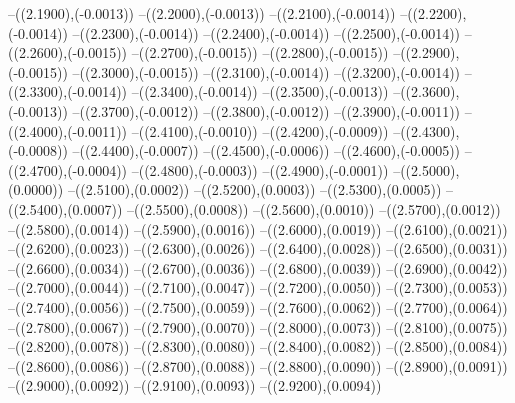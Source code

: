 {	--({\sx*(2.1900)},{\sy*(-0.0013)})
	--({\sx*(2.2000)},{\sy*(-0.0013)})
	--({\sx*(2.2100)},{\sy*(-0.0014)})
	--({\sx*(2.2200)},{\sy*(-0.0014)})
	--({\sx*(2.2300)},{\sy*(-0.0014)})
	--({\sx*(2.2400)},{\sy*(-0.0014)})
	--({\sx*(2.2500)},{\sy*(-0.0014)})
	--({\sx*(2.2600)},{\sy*(-0.0015)})
	--({\sx*(2.2700)},{\sy*(-0.0015)})
	--({\sx*(2.2800)},{\sy*(-0.0015)})
	--({\sx*(2.2900)},{\sy*(-0.0015)})
	--({\sx*(2.3000)},{\sy*(-0.0015)})
	--({\sx*(2.3100)},{\sy*(-0.0014)})
	--({\sx*(2.3200)},{\sy*(-0.0014)})
	--({\sx*(2.3300)},{\sy*(-0.0014)})
	--({\sx*(2.3400)},{\sy*(-0.0014)})
	--({\sx*(2.3500)},{\sy*(-0.0013)})
	--({\sx*(2.3600)},{\sy*(-0.0013)})
	--({\sx*(2.3700)},{\sy*(-0.0012)})
	--({\sx*(2.3800)},{\sy*(-0.0012)})
	--({\sx*(2.3900)},{\sy*(-0.0011)})
	--({\sx*(2.4000)},{\sy*(-0.0011)})
	--({\sx*(2.4100)},{\sy*(-0.0010)})
	--({\sx*(2.4200)},{\sy*(-0.0009)})
	--({\sx*(2.4300)},{\sy*(-0.0008)})
	--({\sx*(2.4400)},{\sy*(-0.0007)})
	--({\sx*(2.4500)},{\sy*(-0.0006)})
	--({\sx*(2.4600)},{\sy*(-0.0005)})
	--({\sx*(2.4700)},{\sy*(-0.0004)})
	--({\sx*(2.4800)},{\sy*(-0.0003)})
	--({\sx*(2.4900)},{\sy*(-0.0001)})
	--({\sx*(2.5000)},{\sy*(0.0000)})
	--({\sx*(2.5100)},{\sy*(0.0002)})
	--({\sx*(2.5200)},{\sy*(0.0003)})
	--({\sx*(2.5300)},{\sy*(0.0005)})
	--({\sx*(2.5400)},{\sy*(0.0007)})
	--({\sx*(2.5500)},{\sy*(0.0008)})
	--({\sx*(2.5600)},{\sy*(0.0010)})
	--({\sx*(2.5700)},{\sy*(0.0012)})
	--({\sx*(2.5800)},{\sy*(0.0014)})
	--({\sx*(2.5900)},{\sy*(0.0016)})
	--({\sx*(2.6000)},{\sy*(0.0019)})
	--({\sx*(2.6100)},{\sy*(0.0021)})
	--({\sx*(2.6200)},{\sy*(0.0023)})
	--({\sx*(2.6300)},{\sy*(0.0026)})
	--({\sx*(2.6400)},{\sy*(0.0028)})
	--({\sx*(2.6500)},{\sy*(0.0031)})
	--({\sx*(2.6600)},{\sy*(0.0034)})
	--({\sx*(2.6700)},{\sy*(0.0036)})
	--({\sx*(2.6800)},{\sy*(0.0039)})
	--({\sx*(2.6900)},{\sy*(0.0042)})
	--({\sx*(2.7000)},{\sy*(0.0044)})
	--({\sx*(2.7100)},{\sy*(0.0047)})
	--({\sx*(2.7200)},{\sy*(0.0050)})
	--({\sx*(2.7300)},{\sy*(0.0053)})
	--({\sx*(2.7400)},{\sy*(0.0056)})
	--({\sx*(2.7500)},{\sy*(0.0059)})
	--({\sx*(2.7600)},{\sy*(0.0062)})
	--({\sx*(2.7700)},{\sy*(0.0064)})
	--({\sx*(2.7800)},{\sy*(0.0067)})
	--({\sx*(2.7900)},{\sy*(0.0070)})
	--({\sx*(2.8000)},{\sy*(0.0073)})
	--({\sx*(2.8100)},{\sy*(0.0075)})
	--({\sx*(2.8200)},{\sy*(0.0078)})
	--({\sx*(2.8300)},{\sy*(0.0080)})
	--({\sx*(2.8400)},{\sy*(0.0082)})
	--({\sx*(2.8500)},{\sy*(0.0084)})
	--({\sx*(2.8600)},{\sy*(0.0086)})
	--({\sx*(2.8700)},{\sy*(0.0088)})
	--({\sx*(2.8800)},{\sy*(0.0090)})
	--({\sx*(2.8900)},{\sy*(0.0091)})
	--({\sx*(2.9000)},{\sy*(0.0092)})
	--({\sx*(2.9100)},{\sy*(0.0093)})
	--({\sx*(2.9200)},{\sy*(0.0094)})
}
